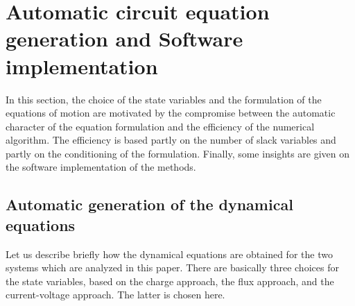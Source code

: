 \section{Automatic circuit equation generation and Software implementation}

In this section, the choice of the state variables and the formulation of the equations of motion are motivated by the compromise between the automatic character of the equation formulation and the efficiency of the numerical algorithm. The efficiency is based partly on the number of slack variables and partly on the conditioning of the formulation. Finally, some insights are given on the software implementation of the methods.

\subsection{Automatic generation of the dynamical equations}
\label{sec:acef}



Let us describe briefly how the dynamical equations are obtained for the two systems which are analyzed in this paper. There are basically three choices for the state variables, based on the charge approach, the flux approach, and the current-voltage approach. The latter is chosen here.  

